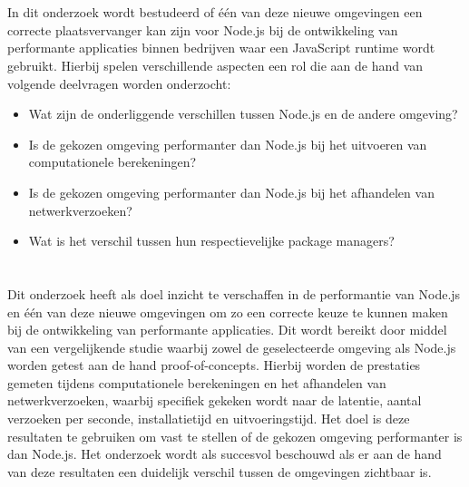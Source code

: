 \section{}%
\label{sec:onderzoeksvraag}

In dit onderzoek wordt bestudeerd of één van deze nieuwe omgevingen
een correcte plaatsvervanger kan zijn voor Node.js bij de ontwikkeling van performante applicaties binnen bedrijven 
waar een JavaScript runtime wordt gebruikt.
Hierbij spelen verschillende aspecten een rol die aan de hand van volgende deelvragen worden onderzocht:
\begin{itemize}
  \item Wat zijn de onderliggende verschillen tussen Node.js en de andere omgeving?
  \item Is de gekozen omgeving performanter dan Node.js bij het uitvoeren van computationele berekeningen?
  \item Is de gekozen omgeving performanter dan Node.js bij het afhandelen van netwerkverzoeken?
  \item Wat is het verschil tussen hun respectievelijke package managers?
\end{itemize}

\section{}%
\label{sec:onderzoeksdoelstelling}

Dit onderzoek heeft als doel inzicht te verschaffen in de performantie van Node.js en één van deze nieuwe omgevingen
om zo een correcte keuze te kunnen maken bij de ontwikkeling van performante applicaties. Dit wordt bereikt door middel van een vergelijkende studie
waarbij zowel de geselecteerde omgeving als Node.js worden getest aan de hand proof-of-concepts. 
Hierbij worden de prestaties gemeten tijdens computationele berekeningen en het afhandelen van netwerkverzoeken, waarbij specifiek gekeken wordt naar
de latentie, aantal verzoeken per seconde, installatietijd en uitvoeringstijd. 
Het doel is deze resultaten te gebruiken om vast te stellen of de gekozen omgeving performanter is dan Node.js. 
Het onderzoek wordt als succesvol beschouwd als er aan de hand van deze resultaten een duidelijk verschil tussen de omgevingen zichtbaar is.
\section{}%
\label{sec:opzet-bachelorproef}

